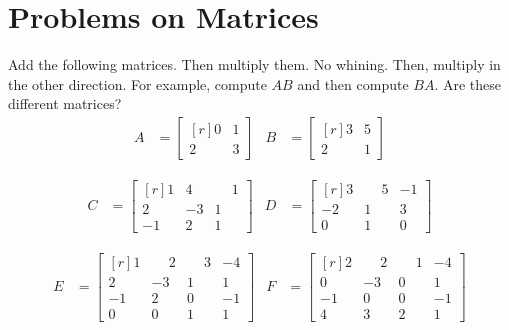 \documentclass[crop=false,class=article]{standalone}                           %
\begin{document}
    \section{Problems on Matrices}
        \begin{problem}
            Add the following matrices. Then multiply them. No whining.
            Then, multiply in the other direction. For example, compute
            $AB$ and then compute $BA$. Are these different matrices?
            \begin{align*}
                A&=
                \begin{bmatrix*}[r]
                    0&1\\
                    2&3
                \end{bmatrix*}
                &
                B&=
                \begin{bmatrix*}[r]
                    3&5\\
                    2&1
                \end{bmatrix*}
            \end{align*}
            \par\hfill\par
            \begin{align*}
                C&=
                \begin{bmatrix*}[r]
                    1&4&\phantom{\minus}1\\
                    2&\minus{3}&1\\
                    \minus{1}&2&1
                \end{bmatrix*}
                &
                D&=
                \begin{bmatrix*}[r]
                    3&\phantom{\minus}5&\minus{1}\\
                    \minus{2}&1&3\\
                    0&1&0
                \end{bmatrix*}
            \end{align*}
            \par\hfill\par
            \begin{align*}
                E&=
                \begin{bmatrix*}[r]
                    1&\phantom{\minus}2&\phantom{\minus}3&\minus{4}\\
                    2&\minus{3}&1&1\\
                    \minus{1}&2&0&\minus{1}\\
                    0&0&1&1
                \end{bmatrix*}
                &
                F&=
                \begin{bmatrix*}[r]
                    2&\phantom{\minus}2&\phantom{\minus}1&\minus{4}\\
                    0&\minus{3}&0&1\\
                    \minus{1}&0&0&\minus{1}\\
                    4&3&2&1
                \end{bmatrix*}
            \end{align*}
        \end{problem}
\end{document}
